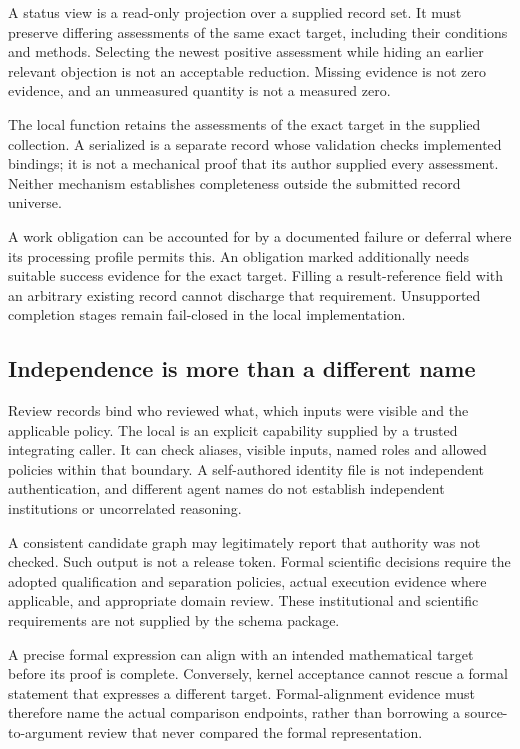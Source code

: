  A status view is a read-only projection over a supplied record set. It must preserve differing assessments of the same exact target, including their conditions and methods. Selecting the newest positive assessment while hiding an earlier relevant objection is not an acceptable reduction. Missing evidence is not zero evidence, and an unmeasured quantity is not a measured zero.

The local  function retains the assessments of the exact target in the supplied collection. A serialized  is a separate record whose validation checks implemented bindings; it is not a mechanical proof that its author supplied every assessment. Neither mechanism establishes completeness outside the submitted record universe.

 A work obligation can be accounted for by a documented failure or deferral where its processing profile permits this. An obligation marked  additionally needs suitable success evidence for the exact target. Filling a result-reference field with an arbitrary existing record cannot discharge that requirement. Unsupported completion stages remain fail-closed in the local implementation.

\subsection{Independence is more than a different name}

Review records bind who reviewed what, which inputs were visible and the applicable policy. The local  is an explicit capability supplied by a trusted integrating caller. It can check aliases, visible inputs, named roles and allowed policies within that boundary. A self-authored identity file is not independent authentication, and different agent names do not establish independent institutions or uncorrelated reasoning.

 A consistent candidate graph may legitimately report that authority was not checked. Such output is not a release token. Formal scientific decisions require the adopted qualification and separation policies, actual execution evidence where applicable, and appropriate domain review. These institutional and scientific requirements are not supplied by the schema package.

A precise formal expression can align with an intended mathematical target before its proof is complete. Conversely, kernel acceptance cannot rescue a formal statement that expresses a different target. Formal-alignment evidence must therefore name the actual comparison endpoints, rather than borrowing a source-to-argument review that never compared the formal representation.
